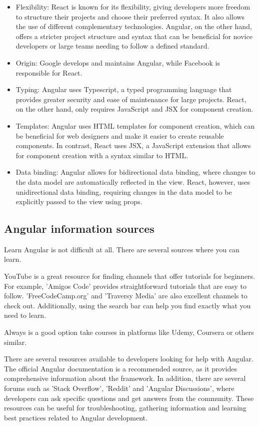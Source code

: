 \documentclass{article}
\begin{document}
\begin{itemize}
  \item Flexibility: React is known for its flexibility, giving developers more freedom to structure their projects and choose their preferred syntax. It also allows the use of different complementary technologies. Angular, on the other hand, offers a stricter project structure and syntax that can be beneficial for novice developers or large teams needing to follow a defined standard.
  \item Origin: Google develops and maintains Angular, while Facebook is responsible for React.
  \item Typing: Angular uses Typescript, a typed programming language that provides greater security and ease of maintenance for large projects. React, on the other hand, only requires JavaScript and JSX for component creation.
  \item Templates: Angular uses HTML templates for component creation, which can be beneficial for web designers and make it easier to create reusable components. In contrast, React uses JSX, a JavaScript extension that allows for component creation with a syntax similar to HTML.
  \item Data binding: Angular allows for bidirectional data binding, where changes to the data model are automatically reflected in the view. React, however, uses unidirectional data binding, requiring changes in the data model to be explicitly passed to the view using props.
\end{itemize}


\subsection{Angular information sources}
Learn Angular is not difficult at all. There are several sources where you can learn. 

YouTube is a great resource for finding channels that offer tutorials for beginners. For example, 'Amigos Code' \cite{amigoscode} provides straightforward tutorials that are easy to follow. 'FreeCodeCamp.org' \cite{freeCodeCamporg} and 'Traversy Media' \cite{traversyMedia} are also excellent channels to check out. Additionally, using the search bar can help you find exactly what you need to learn.

Always is a good option take courses in platforms like Udemy, Coursera or others similar.

There are several resources available to developers looking for help with Angular. The official Angular documentation is a recommended source, as it provides comprehensive information about the framework. In addition, there are several forums such as 'Stack Overflow', 'Reddit' and 'Angular Discussions', where developers can ask specific questions and get answers from the community. These resources can be useful for troubleshooting, gathering information and learning best practices related to Angular development.
\end{document}
